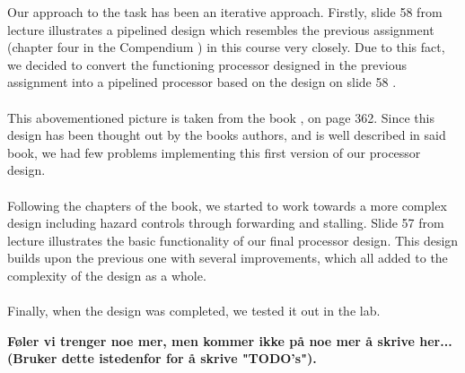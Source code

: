 Our approach to the task has been an iterative approach. Firstly, slide 58 from
lecture \cite{slides-6} illustrates a pipelined design which resembles the
previous assignment (chapter four in the Compendium \cite{compendium}) in this
course very closely. Due to this fact, we decided to convert the functioning
processor designed in the previous assignment into a pipelined processor based
on the design on slide 58 \cite{slides-6}.
\paragraph*{}
This abovementioned picture is taken from the book \cite{patterson12}, on page
362. Since this design has been thought out by the books authors, and is well
described in said book, we had few problems implementing this first version of
our processor design.
\paragraph*{}
Following the chapters of the book, we started to work towards a more complex
design including hazard controls through forwarding and stalling. Slide 57 from
lecture \cite{slides-7} illustrates the basic functionality of our final
processor design. This design builds upon the previous one with several
improvements, which all added to the complexity of the design as a whole.
\paragraph*{}
Finally, when the design was completed, we tested it out in the lab.

\textbf{Føler vi trenger noe mer, men kommer ikke på noe mer å skrive her...
(Bruker dette istedenfor for å skrive "TODO's").}
